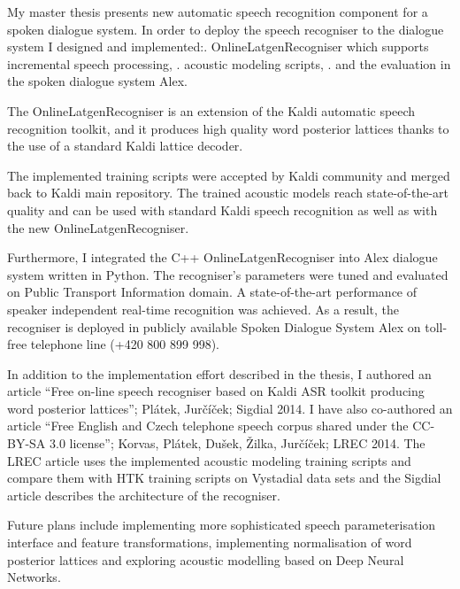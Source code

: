 My master thesis presents new automatic speech recognition component for a spoken dialogue system.
In order to deploy the speech recogniser to the dialogue system I designed and implemented:\hfil\break\hfil{}. OnlineLatgenRecogniser which supports incremental speech processing, \hfil{}. acoustic modeling scripts, \hfil{}. and the evaluation in the spoken dialogue system Alex.\hfil\break

The OnlineLatgenRecogniser is an extension of the Kaldi automatic speech recognition toolkit, and
it produces high quality word posterior lattices thanks to the use of a standard Kaldi lattice decoder.

The implemented training scripts were accepted by Kaldi community and merged back to Kaldi main repository. 
The trained acoustic models reach state-of-the-art quality and can be used with standard Kaldi speech recognition as well as with the new OnlineLatgenRecogniser. 

Furthermore, I integrated the C++ OnlineLatgenRecogniser into Alex dialogue system written in Python. 
The recogniser’s parameters were tuned and evaluated on Public Transport Information domain. 
A state-of-the-art performance of speaker independent real-time recognition was achieved. 
As a result, the recogniser is deployed in publicly available Spoken Dialogue System Alex on toll-free telephone line (+420 800 899 998).

In addition to the implementation effort described in the thesis, I authored an article ``Free on-line speech recogniser based on Kaldi ASR toolkit producing word posterior lattices''; Pl\'{a}tek, Jur\v{c}\'{i}\v{c}ek; Sigdial 2014. I have also co-authored an article ``Free English and Czech telephone speech corpus shared under the CC-BY-SA 3.0 license''; Korvas, Pl\'{a}tek, Du\v{s}ek, \v{Z}ilka, Jur\v{c}\'{i}\v{c}ek; LREC 2014. The LREC article uses the implemented acoustic modeling training scripts and compare them with HTK training scripts on Vystadial data sets and the Sigdial article describes the architecture of the recogniser. 

Future plans include implementing more sophisticated speech parameterisation interface and feature transformations, implementing normalisation of word posterior lattices and exploring acoustic modelling based on Deep Neural Networks.
